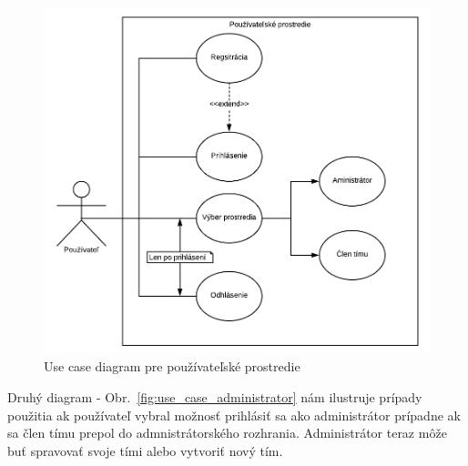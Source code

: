 \begin{figure}[H]
    \centering
    \includegraphics[scale=0.50]{img/DP_use_case_pouzivatel.png}
    \caption{Use case diagram pre používateľské prostredie}
    \label{fig:use_case_pozivatel}
\end{figure}

\indent Druhý diagram - Obr.~\ref{fig:use_case_administrator} nám ilustruje prípady použitia ak používateľ vybral možnosť prihlásiť sa ako administrátor prípadne ak sa člen tímu prepol do admnistrátorského rozhrania. Administrátor teraz môže buť spravovať svoje tími alebo vytvoriť nový tím.

